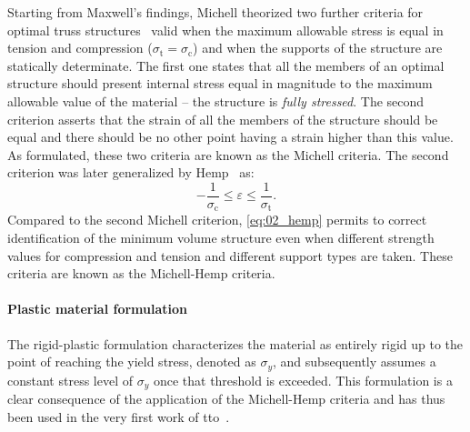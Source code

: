 Starting from Maxwell's findings, Michell theorized two further criteria for optimal truss structures~ valid when the maximum allowable stress is equal in tension and compression ($\sigma_\text{t} = \sigma_\text{c}$) and when the supports of the structure are statically determinate. The first one states that all the members of an optimal structure should present internal stress equal in magnitude to the maximum allowable value of the material -- \ie the structure is \textit{fully stressed}. The second criterion asserts that the strain of all the members of the structure should be equal and there should be no other point having a strain higher than this value. As formulated, these two criteria are known as the Michell criteria. The second criterion was later generalized by Hemp~ as:
\begin{equation} \label{eq:02_hemp}
    -\frac{1}{\sigma_\text{c}}\leq \varepsilon \leq \frac{1}{\sigma_\text{t}}.
\end{equation}
Compared to the second Michell criterion, \eqref{eq:02_hemp} permits to correct identification of the minimum volume structure even when different strength values for compression and tension and different support types are taken. These criteria are known as the Michell-Hemp criteria.

\paragraph{Plastic material formulation}
The rigid-plastic formulation characterizes the material as entirely rigid up to the point of reaching the yield stress, denoted as $\sigma_y$, and subsequently assumes a constant stress level of $\sigma_y$ once that threshold is exceeded. This formulation is a clear consequence of the application of the Michell-Hemp criteria and has thus been used in the very first work of \gls{tto}~. 

